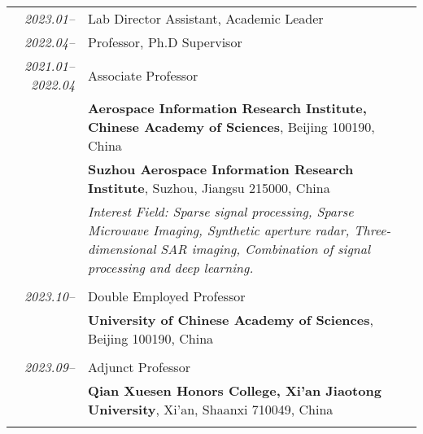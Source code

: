\documentclass[paper=a4,fontsize=11pt]{scrartcl}
\begin{document}
\begin{longtable}{r|p{12cm}}
	
\emph{2023.01--} & Lab Director Assistant, Academic Leader\\	
\emph{2022.04--} & Professor, Ph.D Supervisor\\	
\emph{2021.01--2022.04} & Associate Professor\\	
	& \normalsize\textbf{Aerospace Information Research Institute, Chinese Academy of Sciences}, Beijing 100190, China\\
	& \normalsize\textbf{Suzhou Aerospace Information Research Institute}, Suzhou, Jiangsu 215000, China\\
	& \emph{Interest Field: Sparse signal processing, Sparse Microwave Imaging, Synthetic aperture radar, Three-dimensional SAR imaging, Combination of signal processing and deep learning.} \\
	\multicolumn{2}{c}{} \\


\emph{2023.10--} & Double Employed Professor\\	
& \normalsize\textbf{University of Chinese Academy of Sciences}, Beijing 100190, China \\
\multicolumn{2}{c}{} \\

\emph{2023.09--} & Adjunct Professor \\	
& \normalsize\textbf{Qian Xuesen Honors College, Xi'an Jiaotong University}, Xi'an, Shaanxi 710049, China \\
\multicolumn{2}{c}{} \\


\end{longtable}
\end{document}
